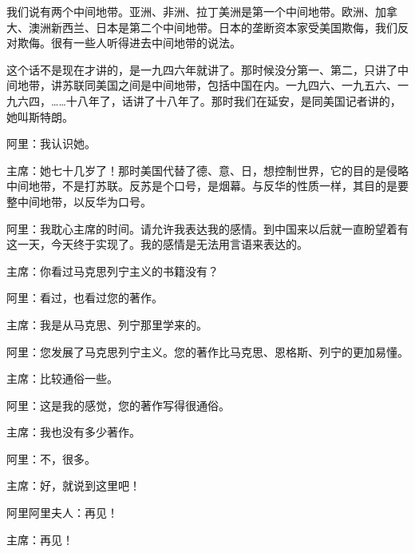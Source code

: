 我们说有两个中间地带。亚洲、非洲、拉丁美洲是第一个中间地带。欧洲、加拿大、澳洲新西兰、日本是第二个中间地带。日本的垄断资本家受美国欺侮，我们反对欺侮。很有一些人听得进去中间地带的说法。

这个话不是现在才讲的，是一九四六年就讲了。那时候没分第一、第二，只讲了中间地带，讲苏联同美国之间是中间地带，包括中国在内。一九四六、一九五六、一九六四，……十八年了，话讲了十八年了。那时我们在延安，是同美国记者讲的，她叫斯特朗。

阿里：我认识她。

主席：她七十几岁了！那时美国代替了德、意、日，想控制世界，它的目的是侵略中间地带，不是打苏联。反苏是个口号，是烟幕。与反华的性质一样，其目的是要整中间地带，以反华为口号。

阿里：我耽心主席的时间。请允许我表达我的感情。到中国来以后就一直盼望着有这一天，今天终于实现了。我的感情是无法用言语来表达的。

主席：你看过马克思列宁主义的书籍没有？

阿里：看过，也看过您的著作。

主席：我是从马克思、列宁那里学来的。

阿里：您发展了马克思列宁主义。您的著作比马克思、恩格斯、列宁的更加易懂。

主席：比较通俗一些。

阿里：这是我的感觉，您的著作写得很通俗。

主席：我也没有多少著作。

阿里：不，很多。

主席：好，就说到这里吧！

阿里阿里夫人：再见！

主席：再见！


